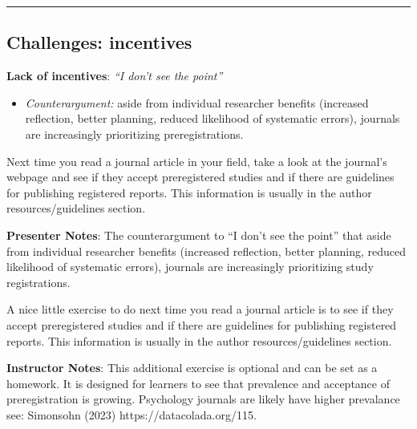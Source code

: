 \documentclass[
  letterpaper,
  DIV=11,
  numbers=noendperiod]{scrartcl}
\providecommand{\tightlist}{%
  \setlength{\itemsep}{0pt}\setlength{\parskip}{0pt}}
\begin{document}
\begin{center}\rule{0.5\linewidth}{0.5pt}\end{center}

\subsection{Challenges: incentives}\label{challenges-incentives}

\textbf{Lack of incentives}: \emph{``I don't see the point''}

\begin{itemize}
\tightlist
\item
  \emph{Counterargument:} aside from individual researcher benefits
  (increased reflection, better planning, reduced likelihood of
  systematic errors), journals are increasingly prioritizing
  preregistrations.
\end{itemize}

\begin{tcolorbox}[enhanced jigsaw, arc=.35mm, bottomrule=.15mm, bottomtitle=1mm, breakable, colback=white, colbacktitle=quarto-callout-note-color!10!white, colframe=quarto-callout-note-color-frame, coltitle=black, left=2mm, leftrule=.75mm, opacityback=0, opacitybacktitle=0.6, rightrule=.15mm, title=\textcolor{quarto-callout-note-color}{\faInfo}\hspace{0.5em}{Find out more}, titlerule=0mm, toprule=.15mm, toptitle=1mm]

Next time you read a journal article in your field, take a look at the
journal's webpage and see if they accept preregistered studies and if
there are guidelines for publishing registered reports. This information
is usually in the author resources/guidelines section.

\end{tcolorbox}

\textbf{Presenter Notes}: The counterargument to ``I don't see the
point'' that aside from individual researcher benefits (increased
reflection, better planning, reduced likelihood of systematic errors),
journals are increasingly prioritizing study registrations.

A nice little exercise to do next time you read a journal article is to
see if they accept preregistered studies and if there are guidelines for
publishing registered reports. This information is usually in the author
resources/guidelines section.

\textbf{Instructor Notes}: This additional exercise is optional and can
be set as a homework. It is designed for learners to see that prevalence
and acceptance of preregistration is growing. Psychology journals are
likely have higher prevalance see: Simonsohn (2023)
https://datacolada.org/115.
\end{document}
